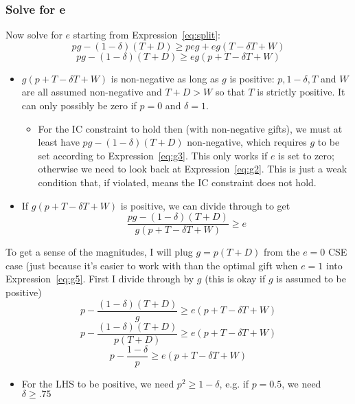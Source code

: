 \documentclass[12pt]{article}
\newcommand{\de}{\delta}
\begin{document}
\subsubsection{Solve for e}
				Now solve for $e$ starting from Expression~\ref{eq:split}:
					$$pg - \left(1 - \de \right) \left( T + D \right) \geq peg + eg \left( T - \de T + W \right)$$
					\begin{equation}
						pg - \left(1 - \de \right) \left( T + D \right) \geq eg \left( p + T - \de T + W \right)
						\label{eq:g5}
					\end{equation}
						\begin{itemize}
							\item {\color{red} $g \left( p + T - \de T + W \right)$ is non-negative as long as $g$ is positive}: $p, 1-\de, T$ and $W$ are all assumed non-negative and $T+D > W$ so that $T$ is strictly positive. It can only possibly be zero if $p=0$ and $\de = 1$.
								\begin{itemize}
									\item For the IC constraint to hold then (with non-negative gifts), we must at least have {\color{red} $pg - \left(1 - \de \right) \left( T + D \right)$ non-negative, which requires $g$ to be set according to Expression~\ref{eq:g3}}. This only works if $e$ is set to zero; otherwise we need to look back at Expression~\ref{eq:g2}. This is just a weak condition that, if violated, means the IC constraint does not hold.
								\end{itemize}
							\item If {\color{red} $g \left( p + T - \de T + W \right)$ is positive}, we can divide through to get
								$$\frac{pg - \left(1 - \de \right) \left( T + D \right)}{g \left( p + T - \de T + W \right)} \geq e$$
						\end{itemize}
				To get a sense of the magnitudes, I will plug $g = p \left(T+D\right)$ from the $e=0$ CSE case (just because it's easier to work with than the optimal gift when $e=1$ into Expression~\ref{eq:g5}. First I divide through by $g$ {\color{blue}(this is okay if $g$ is assumed to be positive)}
						\begin{equation}
							p - \frac{\left(1 - \de \right) \left( T + D \right)}{g} \geq e \left( p + T - \de T + W \right)
							\label{eq:g6}
						\end{equation}
						$$p - \frac{\left(1 - \de \right) \left( T + D \right)}{p \left(T+D\right)} \geq e \left( p + T - \de T + W \right)$$
						$$p - \frac{1 - \de}{p } \geq e \left( p + T - \de T + W \right)$$
							\begin{itemize}
								\item For the LHS to be positive, we need $p^2 \geq 1 - \de$, e.g. if $p = 0.5$, we need $\de \geq .75$
							\end{itemize}
								
\end{document}

